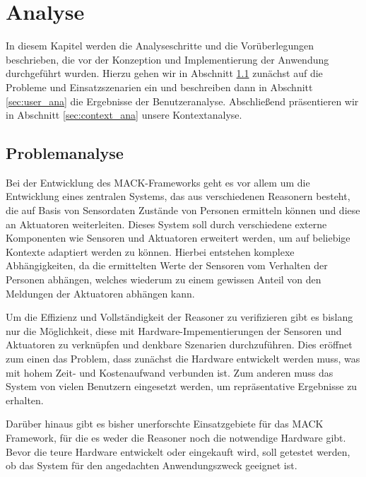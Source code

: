 \chapter{Analyse}\label{chapter:analysis}
In diesem Kapitel werden die Analyseschritte und die Vorüberlegungen beschrieben, die vor der Konzeption und Implementierung der Anwendung durchgeführt wurden. Hierzu gehen wir in Abschnitt \ref{sec:problem_ana} zunächst auf die Probleme und Einsatzszenarien ein und beschreiben dann in Abschnitt \ref{sec:user_ana} die Ergebnisse der Benutzeranalyse. Abschließend präsentieren wir in Abschnitt \ref{sec:context_ana} unsere Kontextanalyse.


\section{Problemanalyse}\label{sec:problem_ana}
Bei der Entwicklung des MACK-Frameworks geht es vor allem um die Entwicklung eines zentralen Systems, das aus verschiedenen Reasonern besteht, die auf Basis von Sensordaten Zustände von Personen ermitteln können und diese an Aktuatoren weiterleiten. Dieses System soll durch verschiedene externe Komponenten wie Sensoren und Aktuatoren erweitert werden, um auf beliebige Kontexte adaptiert werden zu können. Hierbei entstehen komplexe Abhängigkeiten, da die ermittelten Werte der Sensoren vom Verhalten der Personen abhängen, welches wiederum zu einem gewissen Anteil von den Meldungen der Aktuatoren abhängen kann.

Um die Effizienz und Vollständigkeit der Reasoner zu verifizieren gibt es bislang nur die Möglichkeit, diese mit Hardware-Impementierungen der Sensoren und Aktuatoren zu verknüpfen und denkbare Szenarien durchzuführen. Dies eröffnet zum einen das Problem, dass zunächst die Hardware entwickelt werden muss, was mit hohem Zeit- und Kostenaufwand verbunden ist. Zum anderen muss das System von vielen Benutzern eingesetzt werden, um repräsentative Ergebnisse zu erhalten.

Darüber hinaus gibt es bisher unerforschte Einsatzgebiete für das MACK Framework, für die es weder die Reasoner noch die notwendige Hardware gibt. Bevor die teure Hardware entwickelt oder eingekauft wird, soll getestet werden, ob das System für den angedachten Anwendungszweck geeignet ist.

